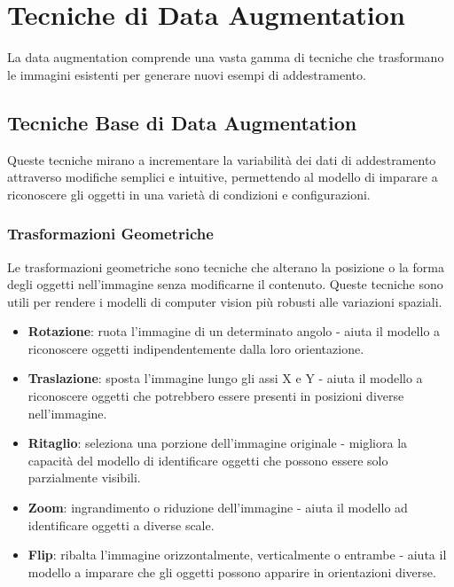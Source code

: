 \section{Tecniche di Data Augmentation}

La data augmentation comprende una vasta gamma di tecniche che trasformano le immagini esistenti per generare nuovi esempi di addestramento.

\subsection{Tecniche Base di Data Augmentation}
Queste tecniche mirano a incrementare la variabilità dei dati di addestramento attraverso modifiche semplici e intuitive, permettendo al modello di imparare a riconoscere gli oggetti in una varietà di condizioni e configurazioni.

\subsubsection{Trasformazioni Geometriche}
Le trasformazioni geometriche sono tecniche che alterano la posizione o la forma degli oggetti nell'immagine senza modificarne il contenuto. Queste tecniche sono utili per rendere i modelli di computer vision più robusti alle variazioni spaziali.

\begin{itemize}
  \item \textbf{Rotazione}: ruota l'immagine di un determinato angolo - aiuta il modello a riconoscere oggetti indipendentemente dalla loro orientazione.
  \item \textbf{Traslazione}: sposta l'immagine lungo gli assi X e Y - aiuta il modello a riconoscere oggetti che potrebbero essere presenti in posizioni diverse nell'immagine.
  \item \textbf{Ritaglio}: seleziona una porzione dell'immagine originale - migliora la capacità del modello di identificare oggetti che possono essere solo parzialmente visibili.
  \item \textbf{Zoom}: ingrandimento o riduzione dell'immagine - aiuta il modello ad identificare oggetti a diverse scale.
  \item \textbf{Flip}: ribalta l'immagine orizzontalmente, verticalmente o entrambe - aiuta il modello a imparare che gli oggetti possono apparire in orientazioni diverse.
\end{itemize}

